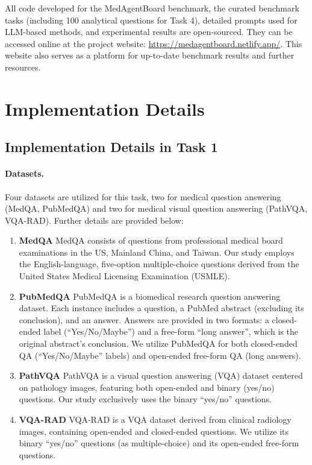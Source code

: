 \documentclass{article}
\begin{document}
All code developed for the MedAgentBoard benchmark, the curated benchmark tasks (including 100 analytical questions for Task 4), detailed prompts used for LLM-based methods, and experimental results are open-sourced. They can be accessed online at the project website: \url{https://medagentboard.netlify.app/}. This website also serves as a platform for up-to-date benchmark results and further resources.

\section{Implementation Details}
\label{sec:app_implementation_details}

\subsection{Implementation Details in Task 1}
\label{sec:app_task1_details}

\paragraph{Datasets.}
\label{sec:app_task1_datasets}

Four datasets are utilized for this task, two for medical question answering (MedQA, PubMedQA) and two for medical visual question answering (PathVQA, VQA-RAD). Further details are provided below:
\begin{enumerate}
    \item \textbf{MedQA} MedQA consists of questions from professional medical board examinations in the US, Mainland China, and Taiwan. Our study employs the English-language, five-option multiple-choice questions derived from the United States Medical Licensing Examination (USMLE).
    \item \textbf{PubMedQA} PubMedQA is a biomedical research question answering dataset. Each instance includes a question, a PubMed abstract (excluding its conclusion), and an answer. Answers are provided in two formats: a closed-ended label (``Yes/No/Maybe'') and a free-form ``long answer'', which is the original abstract's conclusion. We utilize PubMedQA for both closed-ended QA (``Yes/No/Maybe'' labels) and open-ended free-form QA (long answers).
    \item \textbf{PathVQA} PathVQA is a visual question answering (VQA) dataset centered on pathology images, featuring both open-ended and binary (yes/no) questions. Our study exclusively uses the binary ``yes/no'' questions.
    \item \textbf{VQA-RAD} VQA-RAD is a VQA dataset derived from clinical radiology images, containing open-ended and closed-ended questions. We utilize its binary ``yes/no'' questions (as multiple-choice) and its open-ended free-form questions.
\end{enumerate}
\end{document}
